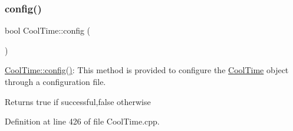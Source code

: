 \subsubsection{\texorpdfstring{config()}{config()}\hspace{0.1cm}{\footnotesize\ttfamily [1/2]}}
{\footnotesize\ttfamily bool Cool\+Time\+::config (\begin{DoxyParamCaption}{ }\end{DoxyParamCaption})}

\hyperlink{class_cool_time_a87c28260c1bc77091162cbcf1ee2e129}{Cool\+Time\+::config()}\+: This method is provided to configure the \hyperlink{class_cool_time}{Cool\+Time} object through a configuration file.

\begin{DoxyReturn}{Returns}
true if successful,false otherwise 
\end{DoxyReturn}


Definition at line 426 of file Cool\+Time.\+cpp.



